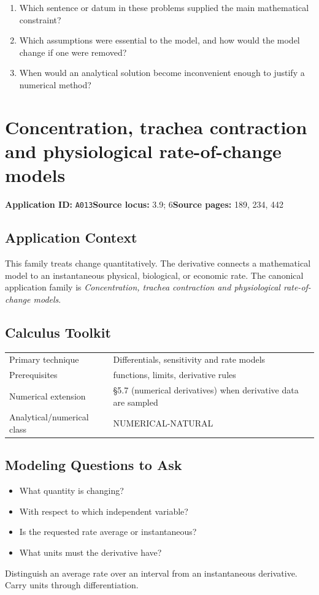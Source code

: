 \documentclass[11pt]{book}
\newcommand{\pid}[1]{\texttt{#1}}
\begin{document}
\begin{reflectionbox}\begin{enumerate}
\item Which sentence or datum in these problems supplied the main mathematical constraint?
\item Which assumptions were essential to the model, and how would the model change if one were removed?
\item When would an analytical solution become inconvenient enough to justify a numerical method?
\end{enumerate}\end{reflectionbox}
\chapter{Concentration, trachea contraction and physiological rate-of-change models}\label{app:A013}
\textbf{Application ID:} \pid{A013}\quad \textbf{Source locus:} 3.9; 6\quad \textbf{Source pages:} 189, 234, 442
\section*{Application Context}
This family treats change quantitatively. The derivative connects a mathematical model to an instantaneous physical, biological, or economic rate. The canonical application family is \emph{Concentration, trachea contraction and physiological rate-of-change models}.
\section*{Calculus Toolkit}
\begin{tabularx}{\textwidth}{@{}lX@{}}\toprule
Primary technique & Differentials, sensitivity and rate models \\
Prerequisites & functions, limits, derivative rules \\
Numerical extension & §5.7 (numerical derivatives) when derivative data are sampled \\
Analytical/numerical class & NUMERICAL-NATURAL \\
\bottomrule\end{tabularx}
\section*{Modeling Questions to Ask}\begin{itemize}
\item What quantity is changing?
\item With respect to which independent variable?
\item Is the requested rate average or instantaneous?
\item What units must the derivative have?
\end{itemize}
\begin{errorbox}Distinguish an average rate over an interval from an instantaneous derivative. Carry units through differentiation.\end{errorbox}
\end{document}
